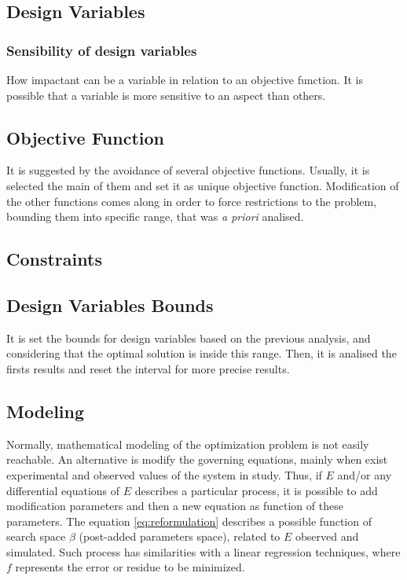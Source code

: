 \subsection{Design Variables}
\subsubsection{Sensibility of design variables}
How impactant can be a variable in relation to an objective function. It is possible that a variable is more sensitive to an aspect than others.

\subsection{Objective Function}
It is suggested by \cite{Deb2012} the avoidance of several objective functions. Usually, it is selected the main of them and set it as unique objective function. Modification of the other functions comes along in order to force restrictions to the problem, bounding them into specific range, that was \textit{a priori} analised.

\subsection{Constraints}

\subsection{Design Variables Bounds}
It is set the bounds for design variables based on the previous analysis, and considering that the optimal solution is inside this range. Then, it is analised the firsts results and reset the interval for more precise results.

\subsection{Modeling}
Normally, mathematical modeling of the optimization problem is not easily reachable. An alternative is modify the governing equations, mainly when exist experimental and observed values of the system in study. Thus, if $E$ and/or any differential equations of $E$ describes a particular process, it is possible to add modification parameters and then a new equation as function of these parameters. The equation \ref{eq:reformulation} describes a possible function of search space $\beta$ (post-added parameters space), related to $E$ observed and simulated. Such process has similarities with a linear regression techniques, where $f$ represents the error or residue to be minimized.

